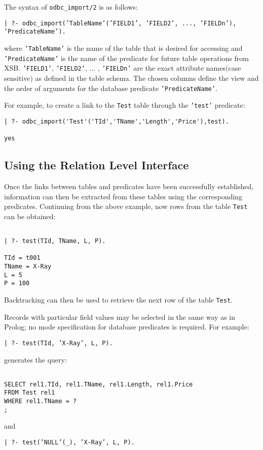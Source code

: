 The syntax of  {\tt odbc\_import/2} is as follows:

\begin{center}
{\tt | ?- odbc\_import('TableName'('FIELD1', 'FIELD2', ..., 'FIELDn'), 'PredicateName').}
\end{center}

where {\tt 'TableName'} is the name of the table that is desired for accessing
and {\tt 'PredicateName'} is the name of the predicate for future table operations 
from XSB. {\tt 'FIELD1'}, {\tt 'FIELD2'}, ... , {\tt 'FIELDn'} are
the exact attribute names$($case sensitive$)$ as defined in the table schema.  The
chosen columns define the view and the order of arguments for the
database predicate {\tt 'PredicateName'}.  
 
For example, to create a link to the {\tt  Test} table through the {\tt 'test'} predicate:
\begin{verbatim}
| ?- odbc_import('Test'('TId','TName','Length','Price'),test).

yes
\end{verbatim}

\subsection{Using the Relation Level Interface}

Once the links between tables and predicates have been successfully established, 
information can then be extracted from these tables using the corresponding 
predicates.   Continuing from the above example, now rows from the table 
{\tt Test} can be obtained:
 \begin{verbatim}

| ?- test(TId, TName, L, P).

TId = t001
TName = X-Ray
L = 5
P = 100 
\end{verbatim}

Backtracking can then be used to retrieve the next row of the table {\tt Test}.

Records with particular field values may be selected in the same way
as in Prolog; no mode specification for database predicates is
required. For example:
\begin{center}

{\tt | ?- test(TId, 'X-Ray', L, P).}
\end{center}
generates the query:
\begin{verbatim}

SELECT rel1.TId, rel1.TName, rel1.Length, rel1.Price
FROM Test rel1
WHERE rel1.TName = ?
;
\end{verbatim}
and 
\begin{center}

{\tt | ?- test('NULL'(\_), 'X-Ray',  L, P).}
\end{center}

